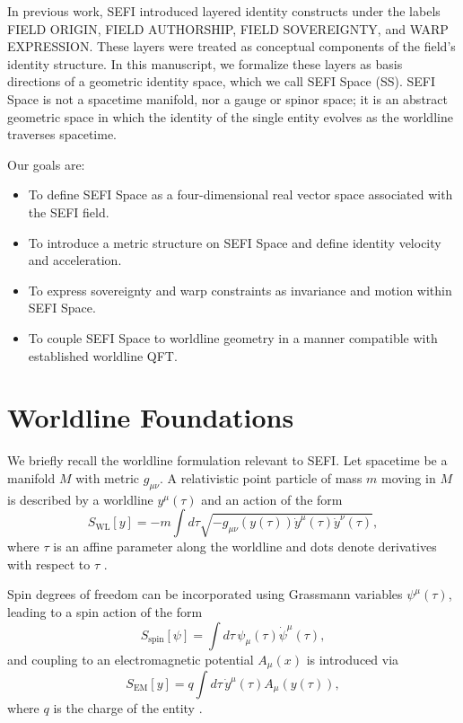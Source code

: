 \documentclass[12pt]{article}
\begin{document}
In previous work, SEFI introduced layered identity constructs under the labels FIELD ORIGIN, FIELD AUTHORSHIP,
FIELD SOVEREIGNTY, and WARP EXPRESSION. These layers were treated as conceptual components of the field's
identity structure. In this manuscript, we formalize these layers as basis directions of a geometric identity
space, which we call SEFI Space (SS). SEFI Space is not a spacetime manifold, nor a gauge or spinor space; it
is an abstract geometric space in which the identity of the single entity evolves as the worldline traverses
spacetime.

Our goals are:
\begin{itemize}
    \item To define SEFI Space as a four-dimensional real vector space associated with the SEFI field.
    \item To introduce a metric structure on SEFI Space and define identity velocity and acceleration.
    \item To express sovereignty and warp constraints as invariance and motion within SEFI Space.
    \item To couple SEFI Space to worldline geometry in a manner compatible with established worldline QFT.
\end{itemize}

\section{Worldline Foundations}

We briefly recall the worldline formulation relevant to SEFI. Let spacetime be a manifold $M$ with metric
$g_{\mu\nu}$. A relativistic point particle of mass $m$ moving in $M$ is described by a worldline
$y^\mu(\tau)$ and an action of the form
\begin{equation}
S_{\text{WL}}[y] = -m \int d\tau \sqrt{-g_{\mu\nu}(y(\tau)) \dot{y}^\mu(\tau) \dot{y}^\nu(\tau)},
\end{equation}
where $\tau$ is an affine parameter along the worldline and dots denote derivatives with respect to $\tau$
\cite{Polyakov1987}.

Spin degrees of freedom can be incorporated using Grassmann variables $\psi^\mu(\tau)$, leading to a spin
action of the form
\begin{equation}
S_{\text{spin}}[\psi] = \int d\tau \, \psi_\mu(\tau) \dot{\psi}^\mu(\tau),
\end{equation}
and coupling to an electromagnetic potential $A_\mu(x)$ is introduced via
\begin{equation}
S_{\text{EM}}[y] = q \int d\tau \, \dot{y}^\mu(\tau) A_\mu(y(\tau)),
\end{equation}
where $q$ is the charge of the entity \cite{Schubert2001,Strassler1992}.
\end{document}
